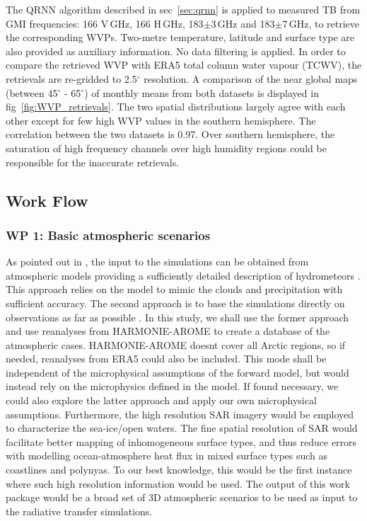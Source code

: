 \documentclass[12pt,oneside,a4paper]{article}
\begin{document}
The QRNN algorithm described in sec~\ref{sec:qrnn} is applied to measured TB from GMI frequencies: 166 V\,GHz, 166 H\,GHz, 183$\pm$3\,GHz and 183$\pm$7\,GHz, to retrieve the corresponding WVPs. Two-metre temperature, latitude and surface type are also provided as auxiliary information. No data filtering is applied. In order to compare the retrieved WVP with ERA5 total column water  vapour (TCWV), the retrievals are re-gridded to 2.5$^{\circ}$ resolution. A comparison of the near global maps (between 45$^\circ$ - 65$^\circ$) of monthly means from both datasets is displayed in fig~\ref{fig:WVP_retrievals}. The two spatial distributions largely agree with each other except for few high WVP values in the southern hemisphere. The correlation between the two datasets is 0.97. Over southern hemisphere, the saturation of high frequency channels over high humidity regions could be responsible for the inaccurate retrievals. 

\subsection{Work Flow}
\label{sec:wp}

\subsubsection*{WP 1: Basic atmospheric scenarios}
%
\label{sec:emissivity}
As pointed out in \citet{eriksson:towar:20}, the input to the simulations can
be obtained from atmospheric models providing a sufficiently detailed
description of hydrometeors \citep[e.g.][]{wang2017statistical}. This approach
relies on the model to mimic the clouds and precipitation with sufficient accuracy. The second approach is to base the simulations directly on observations as far as possible \citep{ekelund:using:20}. In this study, we shall use the former approach and use reanalyses from HARMONIE-AROME to create a database of the atmospheric cases. HARMONIE-AROME doesnt cover all Arctic regions, so if needed, reanalyses from ERA5 could also be included. This mode shall be independent of the microphysical assumptions of the forward model, but would instead rely on the microphysics defined in the model. If found necessary, we could also explore the latter approach and apply our own microphysical assumptions.
Furthermore, the high resolution SAR imagery would be employed to characterize the sea-ice/open waters. The fine spatial resolution of SAR would facilitate better mapping of inhomogeneous surface types, and thus reduce errors with modelling ocean-atmosphere heat flux in mixed surface types such as coastlines and polynyas. To our best knowledge, this would be the first instance where such high resolution information would be used. 
The output of this work package would be a broad set of 3D atmospheric scenarios to be used as input to the radiative transfer simulations.
\end{document}
